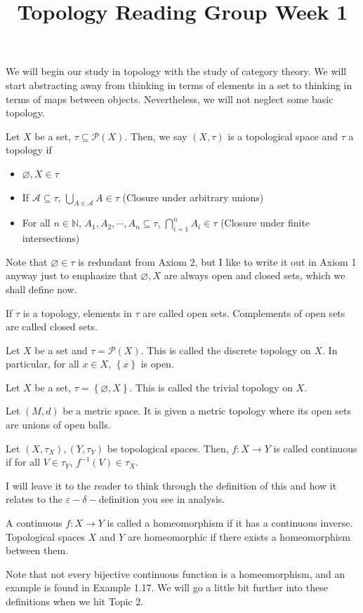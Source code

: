 \documentclass[12pt,reqno]{amsart}
\numberwithin{theorem}{section}
\theoremstyle{definition}
\theoremstyle{remark}
\numberwithin{equation}{section}
\newcommand{\set}[1]{\left \{ #1 \right \}}
\theoremstyle{definition}
\begin{document}
\title{Topology Reading Group Week 1}
\maketitle
We will begin our study in topology with the study of category theory. We will start abstracting away from thinking in terms of elements in a set to thinking in terms of maps between objects. Nevertheless, we will not neglect some basic topology.
\begin{definition}
    Let $X$ be a set, $\tau \subseteq \mathcal P(X)$. Then, we say $(X,\tau)$ is a topological space and $\tau$ a topology if
    \begin{itemize}
        \item $\varnothing, X \in \tau$
        \item If $\mathcal A \subseteq \tau$, $\bigcup_{A \in \mathcal A}A \in \tau$ (Closure under arbitrary unions)
        \item For all $n \in \mathbb N$, $A_1,A_2,\cdots,A_n\subseteq \tau$, $\bigcap_{i=1}^n A_i \in \tau$ (Closure under finite intersections)
    \end{itemize}
\end{definition}
Note that $\varnothing \in \tau $ is redundant from Axiom 2, but I like to write it out in Axiom 1 anyway just to emphasize that $\varnothing , X$ are always open and closed sets, which we shall define now.
\begin{definition}
    If $\tau$ is a topology, elements in $\tau$ are called open sets. Complements of open sets are called closed sets.
\end{definition}
\begin{example}
    Let $X$ be a set and $\tau = \mathcal P(X)$. This is called the discrete topology on $X$. In particular, for all $x \in X$, $\set x$ is open.
\end{example}
\begin{example}
    Let $X$ be a set, $\tau = \set{\varnothing, X}$. This is called the trivial topology on $X$.
\end{example}
\begin{example}
    Let $(M,d)$ be a metric space. It is given a metric topology where its open sets are unions of open balls.
\end{example}
\begin{definition}
    Let $(X,\tau_X),(Y,\tau_Y)$ be topological spaces. Then, $f:X\rightarrow Y$ is called continuous if for all $V \in \tau_Y$, $f^{-1}(V) \in \tau_X$.
\end{definition}
I will leave it to the reader to think through the definition of this and how it relates to the $\varepsilon-\delta-$definition you see in analysis. 
\begin{definition}
    A continuous $f:X\rightarrow Y$ is called a homeomorphism if it has a continuous inverse. Topological spaces $X$ and $Y$ are homeomorphic if there exists a homeomorphism between them.
\end{definition}
Note that not every bijective continuous function is a homeomorphism, and an example is found in \cite{leinster} Example 1.17. We will go a little bit further into these definitions when we hit Topic 2.
\end{document}
